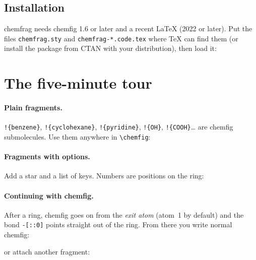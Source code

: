 \documentclass[11pt]{article}
\newcommand\cs[1]{\texttt{\textbackslash#1}}
\newcommand\frag[1]{\texttt{!\{#1\}}}
\newcommand\pkg[1]{\textsf{#1}}
\begin{document}
\subsection{Installation}
\pkg{chemfrag} needs \pkg{chemfig} 1.6 or later and a recent \LaTeX{}
(2022 or later). Put the files \texttt{chemfrag.sty} and
\texttt{chemfrag-*.code.tex} where \TeX{} can find them (or install the
package from CTAN with your distribution), then load it:
\begin{code}
\usepackage{chemfrag}   %
\end{code}

\section{The five-minute tour}

\paragraph{Plain fragments.} \frag{benzene}, \frag{cyclohexane},
\frag{pyridine}, \frag{OH}, \frag{COOH}\dots{} are \pkg{chemfig}
submolecules. Use them anywhere in \cs{chemfig}:
\begin{example}
\quad
{}\quad
{}
\end{example}

\paragraph{Fragments with options.} Add a star and a list of keys. Numbers
are positions on the ring:
\begin{example}
\end{example}

\paragraph{Continuing with chemfig.} After a ring, \pkg{chemfig} goes on
from the \emph{exit atom} (atom~1 by default) and the bond
\verb|-[::0]| points straight out of the ring. From there you write normal
\pkg{chemfig}:
\begin{example}
\end{example}
or attach another fragment:
\begin{example}
\end{example}
\end{document}

